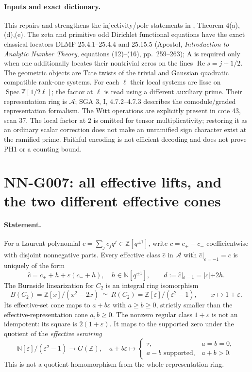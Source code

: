 \paragraph{Inputs and exact dictionary.}
This repairs and strengthens the injectivity/pole statements in
,
Theorem 4(a),(d),(e). The zeta and primitive odd Dirichlet functional
equations have the exact classical locators DLMF 25.4.1--25.4.4
and 25.15.5 (Apostol, \emph{Introduction to Analytic Number
Theory}, equations (12)--(16), pp.\ 259--263); A is required only when
one additionally locates their nontrivial zeros on the lines
$\operatorname{Re}s=j+1/2$. The geometric objects are Tate twists
of the trivial and Gaussian quadratic compatible rank-one systems.
For each $\ell$ their local systems are lisse on
$\operatorname{Spec}\mathbb Z[1/2\ell]$; the factor at $\ell$
is read using a different auxiliary prime. Their representation
ring is $\mathcal A$; SGA 3, I, 4.7.2--4.7.3 describes the
comodule/graded representation formalism. The Witt operations
are explicitly present in cote 43, scan 37. The local factor at
$2$ is omitted for tensor multiplicativity; restoring it as an
ordinary scalar correction does not make an unramified sign
character exist at the ramified prime. Faithful encoding is not
efficient decoding and does not prove PH1 or a counting bound.



\section{NN-G007: all effective lifts, and the two different effective cones}
\paragraph{Statement.}
For a Laurent polynomial $c=\sum_j c_jq^j\in\mathbb Z[q^{\pm1}]$,
write $c=c_+-c_-$ coefficientwise with disjoint nonnegative parts.
Every effective class $\widehat c$ in $\mathcal A$ with
$\widehat c|_{\varepsilon=-1}=c$ is uniquely of the form
\[
 \widehat c=c_++h+\varepsilon(c_-+h),\quad
 h\in\mathbb N[q^{\pm1}],\qquad
 d:=\widehat c|_{\varepsilon=1}=|c|+2h.             \tag{G007.1}
\]
The Burnside linearization for $C_2$ is an integral ring
isomorphism
\[
 B(C_2)=\mathbb Z[x]/(x^2-2x)\ \simeq\
 R(C_2)=\mathbb Z[\varepsilon]/(\varepsilon^2-1),
 \qquad x\mapsto1+\varepsilon.                    \tag{G007.2}
\]
Its effective-set cone maps to $a+b\varepsilon$ with
$a\ge b\ge0$, strictly smaller than the effective-representation
cone $a,b\ge0$. The nonzero regular class $1+\varepsilon$ is not
an idempotent: its square is $2(1+\varepsilon)$. It maps to the
supported zero under the quotient of the \emph{effective semiring}
\[
 \mathbb N[\varepsilon]/(\varepsilon^2-1)\longrightarrow G(\mathbb Z),
 \quad a+b\varepsilon\longmapsto
 \begin{cases}\tau,&a=b=0,\\a-b\text{ supported},&a+b>0.\end{cases}
\]
This is not a quotient homomorphism from the whole representation ring.

